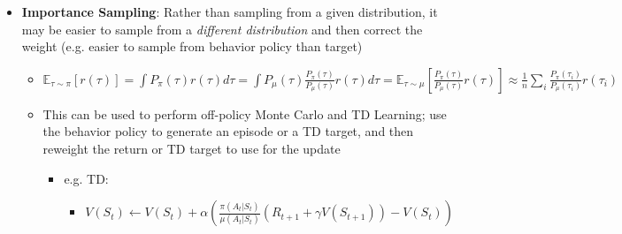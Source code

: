 \documentclass[twocolumn]{article}
\providecommand{\tightlist}{%
  \setlength{\itemsep}{\GlobalItemSep}\setlength{\parskip}{\GlobalListParSkip}}
\newlength{\GlobalItemSep}
\newlength{\GlobalListParSkip}
\begin{document}
\begin{itemize}
\begin{itemize}
\begin{itemize}
\begin{itemize}
\begin{itemize}
          \begin{itemize}
          \tightlist
          \item
            This is the \textbf{behavior policy}, which is
            epsilon-greedy on the target \(Q\)
          \end{itemize}
        \item
          Take action \(A\), observe \(R\), \(S'\)
        \item
          \(Q(S, A) \leftarrow Q(S,A) + \alpha[R + \gamma \max_a Q(S', a) - Q(S, A)]\)

          \begin{itemize}
          \tightlist
          \item
            This is the \textbf{target policy}, which is fully greedy on
            \(Q\)
          \item
            The learning \textquotesingle acts\textquotesingle{} as if
            it took the target policy when updating, but the steps
            actually taken in the environment solely use the behavior
            policy
          \end{itemize}
        \item
          \(S \leftarrow S'\)
        \end{itemize}
      \end{itemize}
    \end{itemize}
  \end{itemize}
\item
  \textbf{Importance Sampling}: Rather than sampling from a given
  distribution, it may be easier to sample from a \emph{different
  distribution} and then correct the weight (e.g. easier to sample from
  behavior policy than target)

  \begin{itemize}
  \tightlist
  \item
    \(\mathbb{E}_{\tau \sim \pi}[r(\tau)] = \int P_\pi(\tau) r(\tau) d\tau = \int P_\mu (\tau) \frac{P_\pi (\tau)}{P_\mu (\tau)} r(\tau) d\tau = \mathbb{E}_{\tau \sim \mu}[\frac{P_\pi (\tau)}{P_\mu (\tau)} r(\tau)] \approx \frac{1}{n} \sum_i \frac{P_\pi (\tau_i)}{P_\mu (\tau_i)} r(\tau_i)\)
  \item
    This can be used to perform off-policy Monte Carlo and TD Learning;
    use the behavior policy to generate an episode or a TD target, and
    then reweight the return or TD target to use for the update

    \begin{itemize}
    \tightlist
    \item
      e.g. TD:

      \begin{itemize}
      \tightlist
      \item
        \(V(S_t) \leftarrow V(S_t) + \alpha(\frac{\pi(A_t | S_t)}{\mu(A_t | S_t)}(R_{t+1} + \gamma V(S_{t+1})) - V(S_t))\)
      \end{itemize}
    \end{itemize}
  \end{itemize}
\end{itemize}
\end{document}

